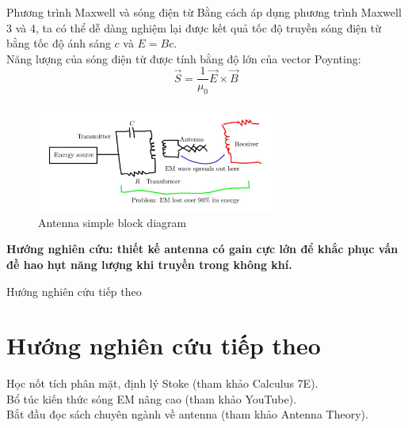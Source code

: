 \documentclass[8pt]{beamer}
\begin{document}
\begin{frame}{Phương trình Maxwell và sóng điện từ}
Bằng cách áp dụng phương trình Maxwell 3 và 4, ta có thể dễ dàng nghiệm lại được kết quả tốc độ truyền sóng điện từ bằng tốc độ ánh sáng $c$ và $E=Bc$.
\\ Năng lượng của sóng điện từ được tính bằng độ lớn của vector Poynting:
$$\overrightarrow{S}=\frac{1}{\mu_{0}}\overrightarrow{E}\times\overrightarrow{B}$$

\begin{figure}[h]
			\includegraphics[width=0.7\textwidth]{antenna.jpg}
			\caption{Antenna simple block diagram}\label{fig:re10}
		\end{figure}
\textbf{Hướng nghiên cứu: thiết kế antenna có gain cực lớn để khắc phục vấn đề hao hụt năng lượng khi truyền trong không khí.}
\end{frame}
\begin{frame}{Hướng nghiên cứu tiếp theo}
\section{Hướng nghiên cứu tiếp theo}
Học nốt tích phân mặt, định lý Stoke (tham khảo Calculus 7E).
\\ Bổ túc kiến thức sóng EM nâng cao (tham khảo YouTube).
\\Bắt đầu đọc sách chuyên ngành về antenna (tham khảo Antenna Theory).
\end{frame}
\end{document}
